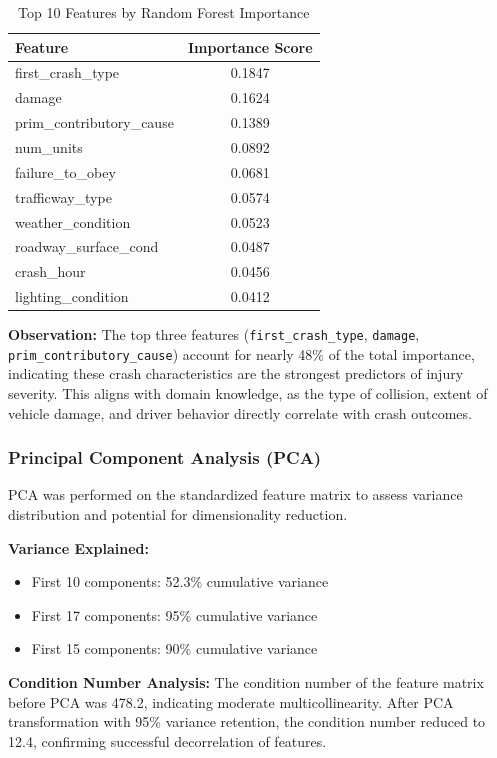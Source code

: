 \documentclass[12pt,man]{apa7}
\begin{document}
\begin{table}[H]
\centering
\caption{Top 10 Features by Random Forest Importance}
\begin{tabular}{lc}
\toprule
\textbf{Feature} & \textbf{Importance Score} \\
\midrule
first\_crash\_type & 0.1847 \\
damage & 0.1624 \\
prim\_contributory\_cause & 0.1389 \\
num\_units & 0.0892 \\
failure\_to\_obey & 0.0681 \\
trafficway\_type & 0.0574 \\
weather\_condition & 0.0523 \\
roadway\_surface\_cond & 0.0487 \\
crash\_hour & 0.0456 \\
lighting\_condition & 0.0412 \\
\bottomrule
\end{tabular}
\end{table}

\textbf{Observation:} The top three features (\texttt{first\_crash\_type}, \texttt{damage}, \texttt{prim\_contributory\_cause}) account for nearly 48\% of the total importance, indicating these crash characteristics are the strongest predictors of injury severity. This aligns with domain knowledge, as the type of collision, extent of vehicle damage, and driver behavior directly correlate with crash outcomes.

\subsubsection{Principal Component Analysis (PCA)}

PCA was performed on the standardized feature matrix to assess variance distribution and potential for dimensionality reduction.

\textbf{Variance Explained:}
\begin{itemize}
    \item First 10 components: 52.3\% cumulative variance
    \item First 17 components: 95\% cumulative variance
    \item First 15 components: 90\% cumulative variance
\end{itemize}

\textbf{Condition Number Analysis:}
The condition number of the feature matrix before PCA was 478.2, indicating moderate multicollinearity. After PCA transformation with 95\% variance retention, the condition number reduced to 12.4, confirming successful decorrelation of features.
\end{document}
